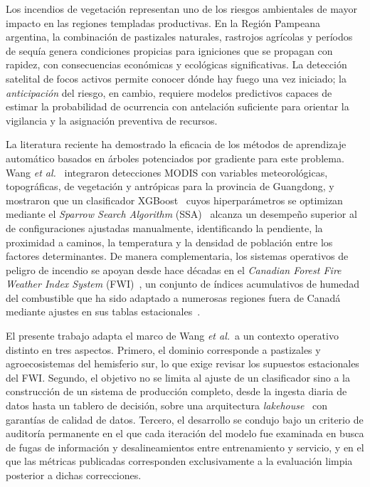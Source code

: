 \documentclass[11pt,a4paper]{article}
\begin{document}
Los incendios de vegetación representan uno de los riesgos ambientales de
mayor impacto en las regiones templadas productivas. En la Región Pampeana
argentina, la combinación de pastizales naturales, rastrojos agrícolas y
períodos de sequía genera condiciones propicias para igniciones que se
propagan con rapidez, con consecuencias económicas y ecológicas
significativas. La detección satelital de focos activos permite conocer
dónde hay fuego una vez iniciado; la \emph{anticipación} del riesgo, en
cambio, requiere modelos predictivos capaces de estimar la probabilidad de
ocurrencia con antelación suficiente para orientar la vigilancia y la
asignación preventiva de recursos.

La literatura reciente ha demostrado la eficacia de los métodos de
aprendizaje automático basados en árboles potenciados por gradiente para
este problema. Wang \emph{et al.}~\cite{wang2026} integraron detecciones
MODIS con variables meteorológicas, topográficas, de vegetación y
antrópicas para la provincia de Guangdong, y mostraron que un clasificador
XGBoost~\cite{chen2016} cuyos hiperparámetros se optimizan mediante el
\emph{Sparrow Search Algorithm} (SSA)~\cite{xue2020} alcanza un desempeño
superior al de configuraciones ajustadas manualmente, identificando la
pendiente, la proximidad a caminos, la temperatura y la densidad de
población entre los factores determinantes. De manera complementaria, los
sistemas operativos de peligro de incendio se apoyan desde hace décadas en
el \emph{Canadian Forest Fire Weather Index System}
(FWI)~\cite{vanwagner1987}, un conjunto de índices acumulativos de humedad
del combustible que ha sido adaptado a numerosas regiones fuera de Canadá
mediante ajustes en sus tablas estacionales~\cite{lawson2008}.

El presente trabajo adapta el marco de Wang \emph{et al.}\ a un contexto
operativo distinto en tres aspectos. Primero, el dominio corresponde a
pastizales y agroecosistemas del hemisferio sur, lo que exige revisar los
supuestos estacionales del FWI. Segundo, el objetivo no se limita al ajuste
de un clasificador sino a la construcción de un sistema de producción
completo, desde la ingesta diaria de datos hasta un tablero de decisión,
sobre una arquitectura \emph{lakehouse}~\cite{armbrust2021} con garantías de
calidad de datos. Tercero, el desarrollo se condujo bajo un criterio de
auditoría permanente en el que cada iteración del modelo fue examinada en
busca de fugas de información y desalineamientos entre entrenamiento y
servicio, y en el que las métricas publicadas corresponden exclusivamente a
la evaluación limpia posterior a dichas correcciones.
\end{document}
